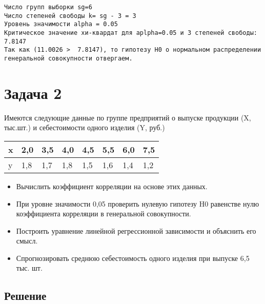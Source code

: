 \documentclass[11pt]{article}
\providecommand{\tightlist}{%
      \setlength{\itemsep}{0pt}\setlength{\parskip}{0pt}}
\begin{document}
    \begin{Verbatim}[commandchars=\\\{\}]
Число групп выборки sg=6
Число степеней свободы k= sg - 3 = 3
Уровень значимости alpha = 0.05
Критическое значение хи-квардат для aplpha=0.05 и 3 степеней свободы:  7.8147
Так как (11.0026 >  7.8147), то гипотезу H0 о нормальном распределении
генеральной совокупности отвергаем.
    \end{Verbatim}

    \section{Задача 2}\label{ux437ux430ux434ux430ux447ux430-2}

Имеются следующие данные по группе предприятий о выпуске продукции (X,
тыс.шт.) и себестоимости одного изделия (Y, руб.)

\begin{longtable}[]{@{}llllllll@{}}
\toprule\noalign{}
x & 2,0 & 3,5 & 4,0 & 4,5 & 5,5 & 6,0 & 7,5 \\
\midrule\noalign{}
\endhead
\bottomrule\noalign{}
\endlastfoot
y & 1,8 & 1,7 & 1,8 & 1,5 & 1,6 & 1,4 & 1,2 \\
\end{longtable}

\begin{itemize}
\tightlist
\item
  Вычислить коэффициент корреляции на основе этих данных.
\item
  При уровне значимости 0,05 проверить нулевую гипотезу H0 равенстве
  нулю коэффициента корреляции в генеральной совокупности.
\item
  Построить уравнение линейной регрессионной зависимости и объяснить его
  смысл.
\item
  Спрогнозировать среднюю себестоимость одного изделия при выпуске 6,5
  тыс. шт.
\end{itemize}

\subsection{Решение}\label{ux440ux435ux448ux435ux43dux438ux435}
\end{document}
